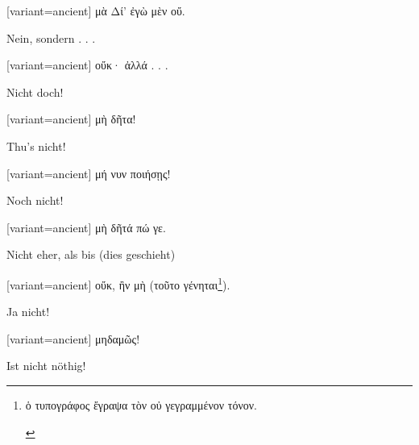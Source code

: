 \begin{greek}[variant=ancient]%
μὰ Δί' ἐγὼ μὲν οὔ.

\end{greek}%
\switchcolumn*

Nein, sondern . . .

\switchcolumn

\begin{greek}[variant=ancient]%
οὔκ· ἀλλά . . .

\end{greek}%
\switchcolumn*

Nicht doch! 

\switchcolumn

\begin{greek}[variant=ancient]%
μὴ δῆτα!

\end{greek}%
\switchcolumn*

Thu's nicht! 

\switchcolumn

\begin{greek}[variant=ancient]%
μή νυν ποιήσῃς!

\end{greek}%
\switchcolumn*

Noch nicht! 

\switchcolumn

\begin{greek}[variant=ancient]%
μὴ δῆτά πώ γε.

\end{greek}%
\switchcolumn*

Nicht eher, als bis (dies geschieht) 

\switchcolumn

\begin{greek}[variant=ancient]%
οὔκ, ἢν μὴ (τοῦτο γένηται\footnote{\begin{latin}%
\textgreek[variant=ancient]{ὁ τυπογράφος ἔγραψα τὸν οὐ γεγραμμένον
τόνον.}\end{latin}%
}).

\end{greek}%
\switchcolumn*

Ja nicht! 

\switchcolumn

\begin{greek}[variant=ancient]%
μηδαμῶς!

\end{greek}%
\switchcolumn*

Ist nicht nöthig! 

